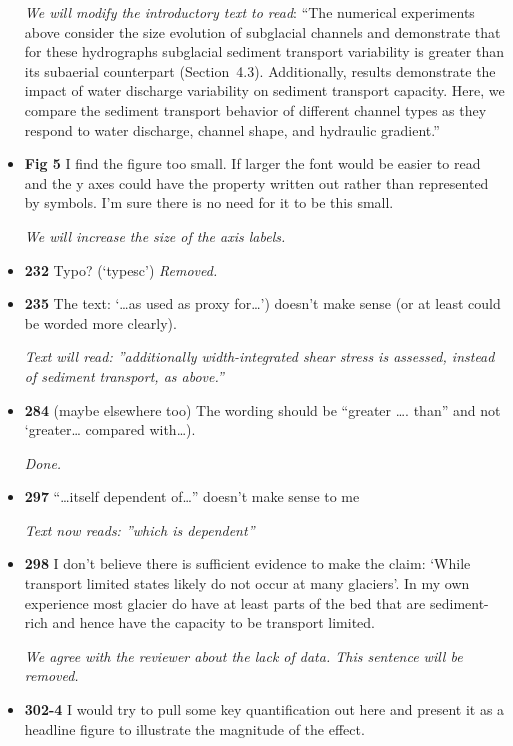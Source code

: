 \documentclass[11pt]{article}
\begin{document}
\begin{itemize}
  \textit{We will modify the introductory text to read}: ``The numerical experiments above consider the size evolution of subglacial channels and demonstrate that for these hydrographs subglacial sediment transport variability is greater than its subaerial counterpart (Section~4.3). 
Additionally, results demonstrate the impact of water discharge variability on sediment transport capacity.
Here, we compare the sediment transport behavior of different channel types as they respond to water discharge, channel shape, and hydraulic gradient.''


\item \textbf{Fig 5} I find the figure too small. If larger the font would be easier to read and the
  y axes could have the property written out rather than represented by
  symbols. I’m sure there is no need for it to be this small.

  \textit{We will increase the size of the axis labels.}

\item \textbf{232} Typo? (‘typesc’)
  \textit{Removed.}
  
\item \textbf{235} The text: ‘…as used as proxy for…’) doesn’t make sense (or at least could be
  worded more clearly).

\textit{Text will read: ''additionally width-integrated shear stress is assessed, instead of sediment transport, as above.''}
  
\item \textbf{284} (maybe
  elsewhere too)
  The wording should be “greater …. than” and not ‘greater… compared
  with…).

  \textit{Done.}

\item \textbf{297} “…itself dependent of…” doesn’t make sense to me

  \textit{Text now reads: ''which is dependent''}

\item \textbf{298} I don’t believe there is sufficient evidence to make the claim: ‘While
  transport limited states likely do not occur at many glaciers’. In my own
  experience most glacier do have at least parts of the bed that are sediment-
  rich and hence have the capacity to be transport limited.

  \textit{We agree with the reviewer about the lack of data. This sentence will be removed. }


  
\item \textbf{302-4} I would try to pull some key quantification out here and present it as a
  headline figure to illustrate the magnitude of the effect.


\end{itemize}
\end{document}
